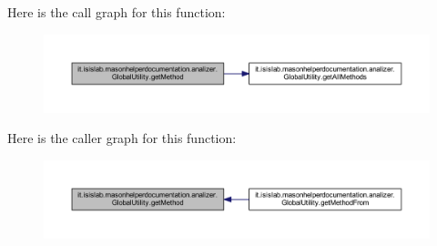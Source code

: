 Here is the call graph for this function\-:
\nopagebreak
\begin{figure}[H]
\begin{center}
\leavevmode
\includegraphics[width=350pt]{classit_1_1isislab_1_1masonhelperdocumentation_1_1analizer_1_1_global_utility_adcb9db2ce5a150598f8a5195218048c2_cgraph}
\end{center}
\end{figure}




Here is the caller graph for this function\-:
\nopagebreak
\begin{figure}[H]
\begin{center}
\leavevmode
\includegraphics[width=350pt]{classit_1_1isislab_1_1masonhelperdocumentation_1_1analizer_1_1_global_utility_adcb9db2ce5a150598f8a5195218048c2_icgraph}
\end{center}
\end{figure}


